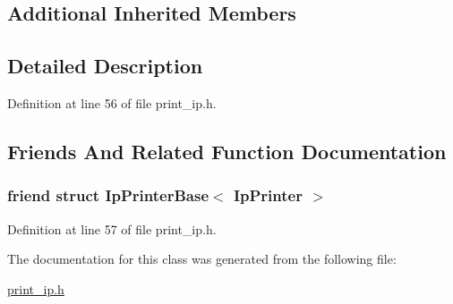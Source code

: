 \subsection*{Additional Inherited Members}


\subsection{Detailed Description}


Definition at line 56 of file print\+\_\+ip.\+h.



\subsection{Friends And Related Function Documentation}
\subsubsection[{\texorpdfstring{Ip\+Printer\+Base$<$ Ip\+Printer $>$}{IpPrinterBase< IpPrinter >}}]{\setlength{\rightskip}{0pt plus 5cm}friend struct {\bf Ip\+Printer\+Base}$<$ {\bf Ip\+Printer} $>$\hspace{0.3cm}{\ttfamily [friend]}}\hypertarget{class_ip_printer_a75f196212357865a0588d194fb42d17c}{}\label{class_ip_printer_a75f196212357865a0588d194fb42d17c}


Definition at line 57 of file print\+\_\+ip.\+h.



The documentation for this class was generated from the following file\+:\begin{DoxyCompactItemize}
\item 
\hyperlink{print__ip_8h}{print\+\_\+ip.\+h}\end{DoxyCompactItemize}
